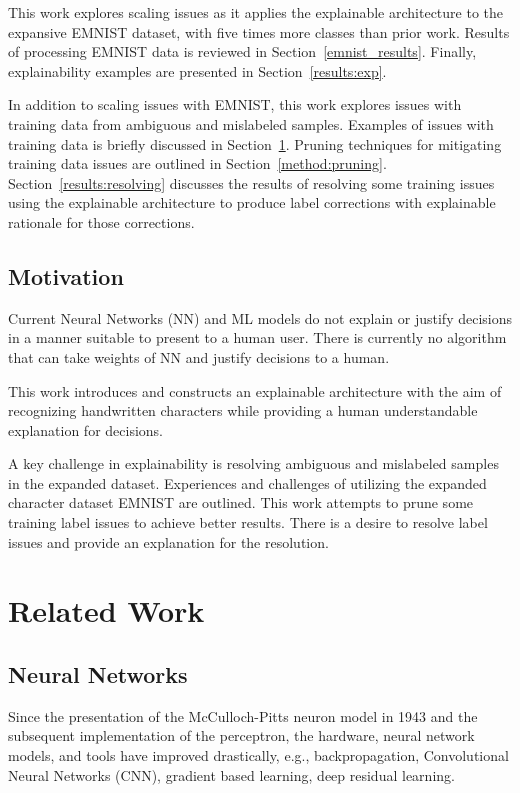 \documentclass[conference]{IEEEtran}
\begin{document}
This work explores scaling issues as it applies the explainable architecture to
the expansive EMNIST dataset, with five times more classes than prior work.
Results of processing EMNIST data is reviewed in Section~\ref{emnist_results}.
Finally, explainability examples are presented in
Section~\ref{results:exp}.

In addition to scaling issues with EMNIST, this work explores issues with
training data from ambiguous and mislabeled samples.  Examples of issues with
training data is briefly discussed in Section~\ref{related_work}. Pruning
techniques for mitigating training data issues are outlined in
Section~\ref{method:pruning}. Section~\ref{results:resolving} discusses the
results of resolving some training issues using the explainable architecture to
produce label corrections with explainable rationale for those corrections.

\subsection{Motivation}

Current Neural Networks (NN) and ML models do not explain or justify decisions
in a manner suitable to present to a human user.  There is currently no
algorithm that can take weights of NN and justify decisions to a human.

This work introduces and constructs an
explainable architecture with the aim of recognizing handwritten characters while
providing a human understandable explanation for decisions.

A key challenge in explainability is resolving ambiguous and mislabeled samples
in the expanded dataset.  Experiences and challenges of utilizing the expanded
character dataset EMNIST are outlined.  This work attempts to prune some
training label issues to achieve better results.  There is a desire to resolve
label issues  and provide an explanation for the resolution.

\section{Related Work}
\label{related_work}

\subsection{Neural Networks}

Since the presentation of the McCulloch-Pitts neuron
model\cite{McCulloch1943-MCCALC-5} in 1943 and the subsequent implementation of
the perceptron\cite{rosenblatt1957perceptron}, the hardware, neural network
models, and tools have improved drastically, e.g.,
backpropagation\cite{6795724}, Convolutional Neural Networks
(CNN)\cite{fukushima1982neocognitron}, gradient based learning\cite{726791},
deep residual learning\cite{7780459}.
\end{document}
